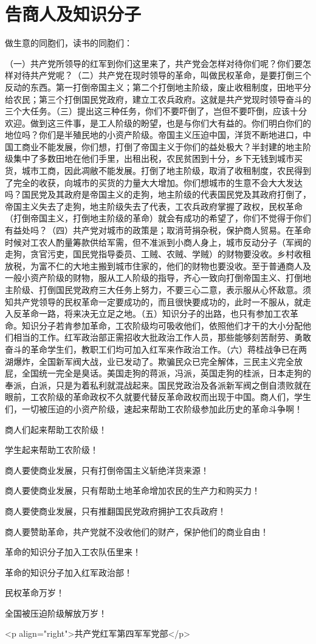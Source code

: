 \section[告商人及知识分子（一九二九年）]{告商人及知识分子}


做生意的同胞们，读书的同胞们：

（一）共产党所领导的红军到你们这里来了，共产党会怎样对待你们呢？你们要怎样对待共产党呢？（二）共产党在现时领导的革命，叫做民权革命，是要打倒三个反动的东西。第一打倒帝国主义；第二个打倒地主阶级，废止收租制度，田地平分给农民；第三个打倒国民党政府，建立工农兵政府。这就是共产党现时领导奋斗的三个大任务。（三）提出这三种任务，你们不要吓倒了，岂但不要吓倒，应该十分欢迎。做到这三件事，是工人阶级的盼望，也是与你们大有益的。你们明白你们的地位吗？你们是半殖民地的小资产阶级。帝国主义压迫中国，洋货不断地进口，中国工商业不能发展，你们想，打倒了帝国主义于你们的益处极大？半封建的地主阶级集中了多数田地在他们手里，出租出税，农民贫困到十分，乡下无钱到城市买货，城市工商，因此凋敝不能发展。打倒了地主阶级，取消了收租制度，农民得到了完全的收获，向城市的买货的力量大大增加。你们想城市的生意不会大大发达吗？国民党及其政府是帝国主义的走狗，地主阶级的代表国民党及其政府打倒了，帝国主义失去了走狗，地主阶级失去了代表，工农兵政府掌握了政权，民权革命（打倒帝国主义，打倒地主阶级的革命）就会有成功的希望了，你们不觉得于你们有益处吗？（四）共产党对城市的政策是；取消苛捐杂税，保护商人贸易。在革命时候对工农人酌量筹款供给军需，但不准派到小商人身上，城市反动分子（军阀的走狗，贪官污吏，国民党指导委员、工贼、农贼、学贼）的财物要没收。乡村收租放税，为富不仁的大地主搬到城市住家的，他们的财物也要没收。至于普通商人及一般小资产阶级的财物，服从工人阶级的指导，齐心一致向打倒帝国主义、打倒地主阶级、打倒国民党政府三大任务上努力，不要三心二意，表示服从心怀敌意。须知共产党领导的民权革命一定要成功的，而且很快要成功的，此时一不服从，就走入反革命一路，将来决无立足之地。（五）知识分子的出路，也只有参加工农革命。知识分子若肯参加革命，工农阶级均可吸收他们，依照他们才干的大小分配他们相当的工作。红军政治部正需招收大批政治工作人员，那些能够刻苦耐劳、勇敢奋斗的革命学生们，教职工们均可加入红军来作政治工作。（六）蒋桂战争已在两湖爆炸，全国新军阀大战，业已发动了。欺骗民众已完全解体，三民主义完全放屁，全国统一完全是臭话。美国走狗的蒋派，冯派，英国走狗的桂派，日本走狗的奉派，白派，只是为着私利就混战起来。国民党政治及各派新军阀之倒自溃败就在眼前，工农阶级的革命政权不久就要代替反革命政权而出现于中国。商人们，学生们，一切被压迫的小资产阶级，速起来帮助工农阶级参加此历史的革命斗争啊！

商人们起来帮助工农阶级！

学生起来帮助工农阶级！

商人要使商业发展，只有打倒帝国主义斩绝洋货来源！

商人要使商业发展，只有帮助土地革命增加农民的生产力和购买力！

商人要使商业发展，只有推翻国民党政府拥护工农兵政府！

商人要赞助革命，共产党就不没收他们的财产，保护他们的商业自由！

革命的知识分子加入工农队伍里来！

革命的知识分子加入红军政治部！

民权革命万岁！

全国被压迫阶级解放万岁！

<p align="right">共产党红军第四军军党部</p>

